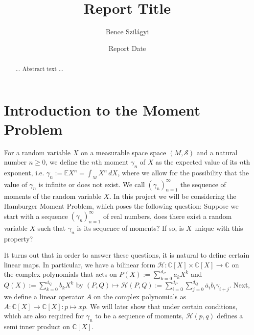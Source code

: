 \documentclass[12pt,oneside]{report}
\title{Report Title}
\date{Report Date}
\author{Bence Szilágyi}
\begin{document}
\maketitle

\begin{abstract} ... Abstract text ... \end{abstract}
\declaration
\dedication{...dedication text...}

\tableofcontents
{}
\newpage
{}


\chapter{Introduction to the Moment Problem}

For a random variable $X$ on a measurable space space $(M, \mathcal{S})$ and a natural number $n \geq 0$, we define the $n$th moment $\gamma_{n}$ of $X$ as the expected value of its $n$th exponent, i.e. $\gamma_{n} := \mathbb{E}X^{n} = \int _{M} X^{n} \, dX$, where we allow for the possibility that the value of $\gamma_{n}$ is infinite or does not exist. We call $(\gamma_{n})_{n=1}^{\infty}$ the sequence of moments of the random variable $X$. In this project we will be considering the Hamburger Moment Problem, which poses the following question: Suppose we start with a sequence $(\gamma_{n})_{n=1}^{\infty}$ of real numbers, does there exist a random variable $X$ such that $\gamma_{n}$ is its sequence of moments? If so, is $X$ unique with this property?

It turns out that in order to answer these questions, it is natural to define certain linear maps. In particular, we have a bilinear form $\mathcal{H}: \mathbb{C}[X] \times \mathbb{C}[X] \to \mathbb{C}$ on the complex polynomials that acts on $P(X) := \sum_{k=0}^{d_{P}}a_{k}X^{k}$ and $Q(X) := \sum_{k=0}^{d_{Q}}b_{k}X^{k}$ by $(P, Q) \mapsto \mathcal{H}(P,Q) := \sum_{i = 0}^{d_{P}} \sum_{j = 0}^{d_{Q}} \overline{a}_{i}b_{i}\gamma_{i+j}$. Next, we define a linear operator $A$ on the complex polynomials as $A: \mathbb{C}[X] \to \mathbb{C}[X]: p \mapsto xp$. We will later show that under certain conditions, which are also required for $\gamma_{n}$ to be a sequence of moments, $\mathcal{H}(p,q)$ defines a semi inner product on $\mathbb{C}[X]$.
\end{document}
